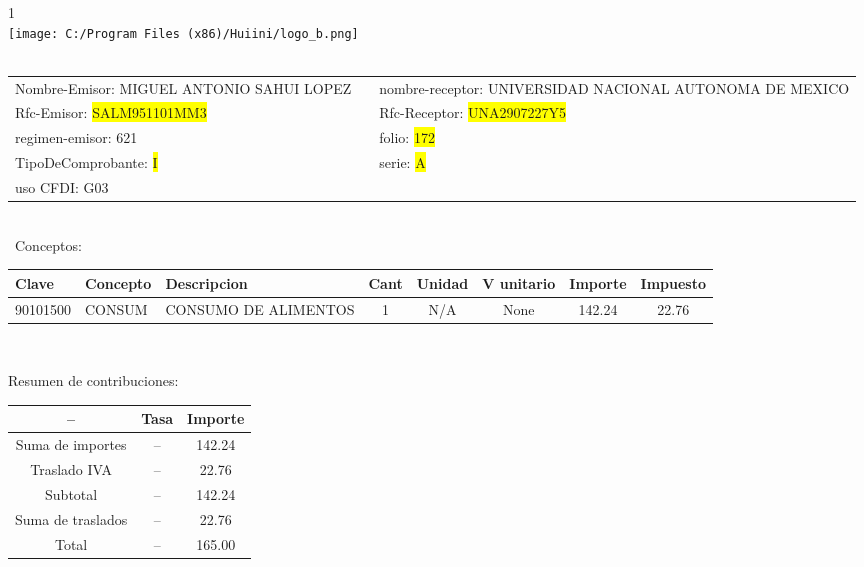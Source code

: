 \documentclass{article}
\begin{document}
\hspace{18cm} 1\\
\texttt{[image: C:/Program Files (x86)/Huiini/logo\_b.png]}
\bigskip\\\
\begin{tabular}{p{11cm}p{1cm}p{8cm}}

Nombre-Emisor: MIGUEL ANTONIO SAHUI LOPEZ && nombre-receptor: UNIVERSIDAD NACIONAL AUTONOMA DE MEXICO\\

Rfc-Emisor: \colorbox{yellow}{ SALM951101MM3 } & & Rfc-Receptor: \colorbox{yellow}{ UNA2907227Y5 }\\

regimen-emisor: 621 & & folio: \colorbox{yellow}{ 172 }\\

TipoDeComprobante: \colorbox{yellow}{ I } & & serie: \colorbox{yellow}{ A }\\

uso CFDI: G03\\



\end{tabular}
\bigskip\bigskip\bigskip\\\
Conceptos:\\
\begin{tabular}{|p{1.5cm}|p{3.6cm}|p{3.6cm}|c|c|c|c|c|}
\hline
Clave & Concepto & Descripcion & Cant & Unidad & V unitario & Importe & Impuesto \\
\hline

90101500 & CONSUM & CONSUMO DE ALIMENTOS & 1 & N/A & None & 142.24 &  22.76 \\
\hline

\end{tabular}\\
\bigskip
\begin{center}
Resumen de contribuciones:\\
\bigskip
\begin{tabular}{|c|c|c|}
\hline
 -- & Tasa & Importe\\
\hline

Suma de importes & -- & 142.24 \\
\hline

Traslado IVA & -- & 22.76 \\
\hline

Subtotal  & -- & 142.24 \\
\hline

Suma de traslados & -- & 22.76 \\
\hline

Total  & -- & 165.00 \\
\hline

\end{tabular}
\end{center}
\end{document}

